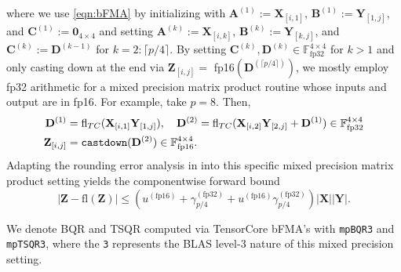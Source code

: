 \documentclass[review,onefignum,onetabnum]{siamart190516}
\newcommand{\F}{\mathbb{F}}
\newcommand{\bb}[1]{\mathbf{#1}}
\newcommand{\fl}{\mathrm{fl}}
\begin{document}
where we use \cref{eqn:bFMA} by initializing with $\bb{A}^{(1)}:= \bb{X}_{[i,1]}$, $\bb{B}^{(1)}:= \bb{Y}_{[1,j]}$, and $\bb{C}^{(1)}:= \bb{0}_{4\times 4}$ and setting $\bb{A}^{(k)}:= \bb{X}_{[i,k]}$, $\bb{B}^{(k)}:= \bb{Y}_{[k,j]}$, and $\bb{C}^{(k)}:= \bb{D}^{(k-1)}$ for $k=2:\lceil p/4\rceil$.
By setting $\bb{C}^{(k)}, \bb{D}^{(k)}\in\F_{\text{fp32}}^{4\times 4}$ for $k>1$ and only casting down at the end via $\bb{Z}_{[i,j]} =$ fp16$(\bb{D}^{(\lceil p/4\rceil)})$, we mostly employ fp32 arithmetic for a mixed precision matrix product routine whose inputs and output are in fp16.
For example, take $p=8$.
Then,
\begin{align*}
\bb{D}^{(1)} &= \fl_{TC}(\bb{X}_{[i,1]} \bb{Y}_{[1,j]}),\quad\bb{D}^{(2)} = \fl_{TC}(\bb{X}_{[i,2]} \bb{Y}_{[2,j]} + \bb{D}^{(1)})\in\F_{\text{fp32}}^{4\times 4}\\
\bb{Z}_{[i,j]} &= \text{\tt castdown}(\bb{D}^{(2)})\in\F_{\text{fp16}}^{4\times 4}.
\end{align*}
Adapting the rounding error analysis in \cite{Blanchard2019} into this specific mixed precision matrix product setting yields the componentwise forward bound 
\begin{equation}
|\bb{Z}-\fl(\bb{Z})| \leq \left(u^{(\text{fp16})}+ \gamma_{p/4}^{(\text{fp32})}+u^{(\text{fp16})} \gamma_{p/4}^{(\text{fp32})}\right)|\bb{X}||\bb{Y}|.\label{eqn:bFMAerr}
\end{equation}

We denote BQR and TSQR computed via TensorCore bFMA's with {\tt mpBQR3} and {\tt mpTSQR3}, where the {\tt 3} represents the BLAS level-3 nature of this mixed precision setting.
\end{document}
